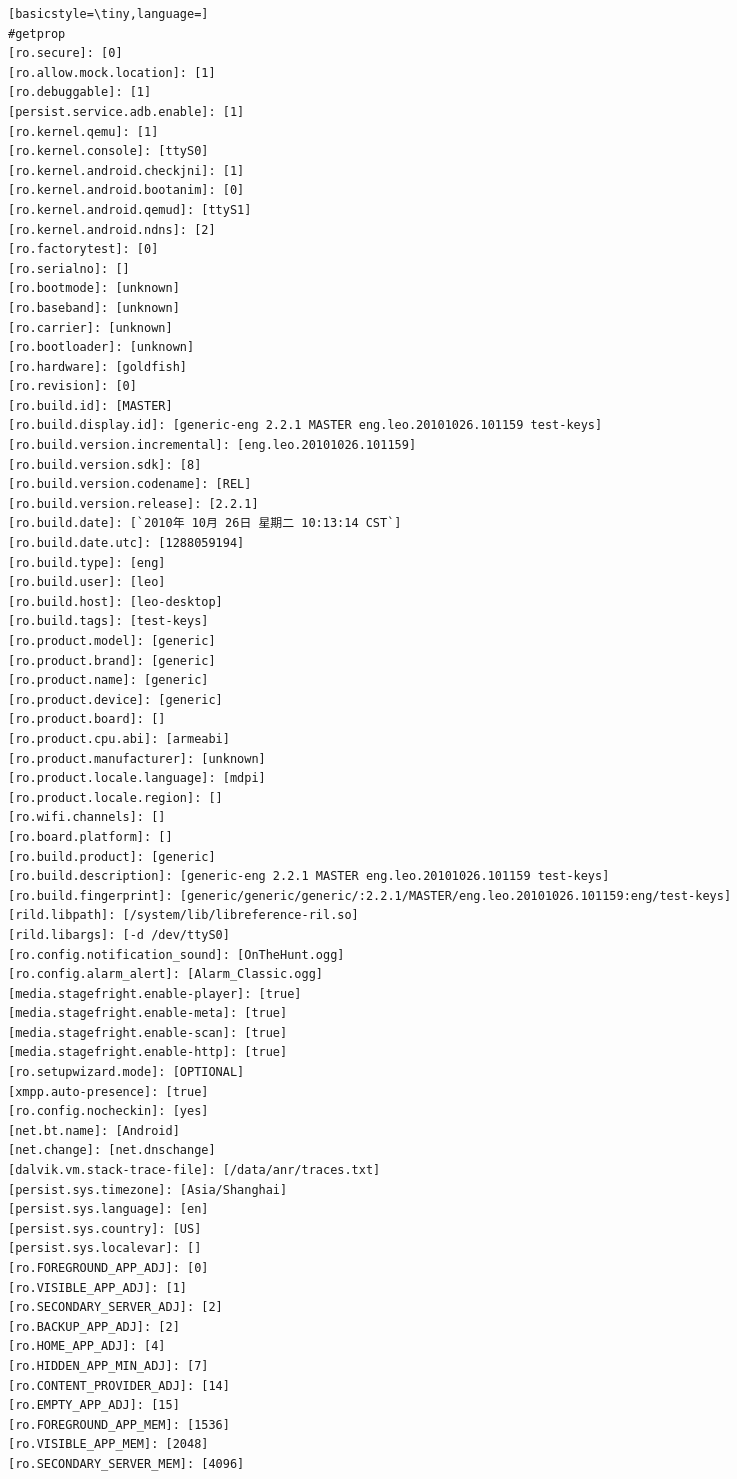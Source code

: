 \documentclass[a4paper,titlepage]{article}
\begin{document}
\begin{multicols}{2}
\begin{lstlisting}[basicstyle=\tiny,language=]
#getprop
[ro.secure]: [0]
[ro.allow.mock.location]: [1]
[ro.debuggable]: [1]
[persist.service.adb.enable]: [1]
[ro.kernel.qemu]: [1]
[ro.kernel.console]: [ttyS0]
[ro.kernel.android.checkjni]: [1]
[ro.kernel.android.bootanim]: [0]
[ro.kernel.android.qemud]: [ttyS1]
[ro.kernel.android.ndns]: [2]
[ro.factorytest]: [0]
[ro.serialno]: []
[ro.bootmode]: [unknown]
[ro.baseband]: [unknown]
[ro.carrier]: [unknown]
[ro.bootloader]: [unknown]
[ro.hardware]: [goldfish]
[ro.revision]: [0]
[ro.build.id]: [MASTER]
[ro.build.display.id]: [generic-eng 2.2.1 MASTER eng.leo.20101026.101159 test-keys]
[ro.build.version.incremental]: [eng.leo.20101026.101159]
[ro.build.version.sdk]: [8]
[ro.build.version.codename]: [REL]
[ro.build.version.release]: [2.2.1]
[ro.build.date]: [`2010年 10月 26日 星期二 10:13:14 CST`]
[ro.build.date.utc]: [1288059194]
[ro.build.type]: [eng]
[ro.build.user]: [leo]
[ro.build.host]: [leo-desktop]
[ro.build.tags]: [test-keys]
[ro.product.model]: [generic]
[ro.product.brand]: [generic]
[ro.product.name]: [generic]
[ro.product.device]: [generic]
[ro.product.board]: []
[ro.product.cpu.abi]: [armeabi]
[ro.product.manufacturer]: [unknown]
[ro.product.locale.language]: [mdpi]
[ro.product.locale.region]: []
[ro.wifi.channels]: []
[ro.board.platform]: []
[ro.build.product]: [generic]
[ro.build.description]: [generic-eng 2.2.1 MASTER eng.leo.20101026.101159 test-keys]
[ro.build.fingerprint]: [generic/generic/generic/:2.2.1/MASTER/eng.leo.20101026.101159:eng/test-keys]
[rild.libpath]: [/system/lib/libreference-ril.so]
[rild.libargs]: [-d /dev/ttyS0]
[ro.config.notification_sound]: [OnTheHunt.ogg]
[ro.config.alarm_alert]: [Alarm_Classic.ogg]
[media.stagefright.enable-player]: [true]
[media.stagefright.enable-meta]: [true]
[media.stagefright.enable-scan]: [true]
[media.stagefright.enable-http]: [true]
[ro.setupwizard.mode]: [OPTIONAL]
[xmpp.auto-presence]: [true]
[ro.config.nocheckin]: [yes]
[net.bt.name]: [Android]
[net.change]: [net.dnschange]
[dalvik.vm.stack-trace-file]: [/data/anr/traces.txt]
[persist.sys.timezone]: [Asia/Shanghai]
[persist.sys.language]: [en]
[persist.sys.country]: [US]
[persist.sys.localevar]: []
[ro.FOREGROUND_APP_ADJ]: [0]
[ro.VISIBLE_APP_ADJ]: [1]
[ro.SECONDARY_SERVER_ADJ]: [2]
[ro.BACKUP_APP_ADJ]: [2]
[ro.HOME_APP_ADJ]: [4]
[ro.HIDDEN_APP_MIN_ADJ]: [7]
[ro.CONTENT_PROVIDER_ADJ]: [14]
[ro.EMPTY_APP_ADJ]: [15]
[ro.FOREGROUND_APP_MEM]: [1536]
[ro.VISIBLE_APP_MEM]: [2048]
[ro.SECONDARY_SERVER_MEM]: [4096]

\end{lstlisting}
\end{multicols}
\end{document}
